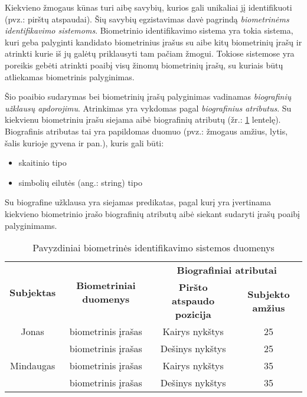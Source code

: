 

Kiekvieno žmogaus kūnas turi aibę savybių, kurios gali unikaliai jį identifikuoti (pvz.: pirštų atspaudai).
Šių savybių egzistavimas davė pagrindą {\it biometrinėms identifikavimo sistemoms}.
Biometrinio identifikavimo sistema yra tokia sistema, kuri geba palyginti kandidato biometrinius įrašus su aibe kitų biometrinių įrašų ir atrinkti kurie iš jų galėtų priklausyti tam pačiam žmogui.
Tokiose sistemose yra poreikis gebėti atrinkti poaibį visų žinomų biometrinių įrašų, su kuriais būtų atliekamas biometrinis palyginimas.

Šio poaibio sudarymas bei biometrinių įrašų palyginimas vadinamas {\it biografinių užklausų apdorojimu}.
Atrinkimas yra vykdomas pagal {\it biografinius atributus}.
Su kiekvienu biometriniu įrašu siejama aibė biografinių atributų (žr.: \ref{tab:exampleGallery} lentelę).
Biografinis atributas tai yra papildomas duomuo (pvz.: žmogaus amžius, lytis, šalis kurioje gyvena ir pan.), kuris gali būti:
\begin{itemize}
\item skaitinio tipo
\item simbolių eilutės (ang.: string) tipo
\end{itemize}

Su biografine užklausa yra siejamas predikatas, pagal kurį yra įvertinama kiekvieno biometrinio įrašo biografinių atributų aibė siekant sudaryti įrašų poaibį palyginimams.

\begin{table}[H]\footnotesize
	\centering
	\begin{tabular}{|c|c|c|c|}
		\hline
		\multirow{2}{*}{{\bf Subjektas}} & \multirow{2}{*}{{\bf Biometriniai duomenys}} & \multicolumn{2}{|c|}{{\bf Biografiniai atributai}}  \\ \cline{3-4}
		& & {\bf Piršto atspaudo pozicija} & {\bf Subjekto amžius} \\
		\hline
		Jonas  & biometrinis įrašas & Kairys nykštys  & 25 \\ \cline{2-4}
		       & biometrinis įrašas & Dešinys nykštys & 25 \\
		\hline
		Mindaugas & biometrinis įrašas & Kairys nykštys  & 35 \\ \cline{2-4}
		          & biometrinis įrašas & Dešinys nykštys & 35 \\
		\hline
	\end{tabular}
	\caption{Pavyzdiniai biometrinės identifikavimo sistemos duomenys}
	\label{tab:exampleGallery}
\end{table}

